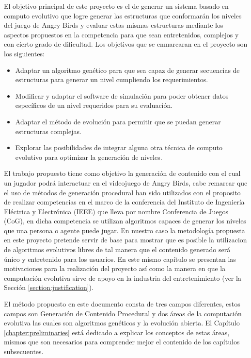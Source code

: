 El objetivo principal de este proyecto es el de generar un sistema basado en
computo evolutivo que logre generar las estructuras que conformarán los niveles
del juego de Angry Birds y evaluar estas mismas estructuras mediante los
aspectos propuestos en la competencia para que sean entretenidos, complejos y con 
cierto grado de dificultad.  Los objetivos que se enmarcaran en el proyecto son los siguientes: 

\begin{itemize}
  \item Adaptar un algoritmo genético para que sea capaz de generar secuencias
  de estructuras para generar un nivel cumpliendo los requerimientos.
  \item Modificar y adaptar el software de simulación para poder obtener datos
  específicos de un nivel requeridos para su evaluación.
  \item Adaptar el método de evolución para permitir que se puedan generar
  estructuras complejas.
  \item Explorar las posibilidades de integrar alguna otra técnica de computo
  evolutivo para optimizar la generación de niveles.
\end{itemize} 

El trabajo propuesto tiene como objetivo la generación
de contenido con el cual un jugador podrá interactuar en el videojuego de
Angry Birds, cabe remarcar que el uso de métodos de generación procedural han
sido utilizados con el proposito de realizar competencias en el marco de la
conferencia del Instituto de Ingeniería Eléctrica y Electrónica (IEEE) que lleva
por nombre Conferencia de Juegos (CoG), en dicha competencia se utilizan
algoritmos capaces de generar los niveles que una persona o agente puede jugar.
En nuestro caso la metodología propuesta en este proyecto pretende servir de
base para mostrar que es posible la utilizacion de algoritmos evolutivos libres
de tal manera que el contenido generado será único y entretenido para los
usuarios. En este mismo capítulo se presentan las motivaciones para la
realización del proyecto así como la manera en que la computación evolutiva
sirve de apoyo en la industria del entretenimiento (ver la Sección
\ref{section:justification}).

El método propuesto en este documento consta de tres campos diferentes, estos
campos son Generación de Contenido Procedural y dos áreas de la computación
evolutiva las cuales son algoritmos genéticos y la evolución abierta. El
Capítulo \ref{chapter:preliminaries} está dedicado a explicar los conceptos
de estas áreas, mismos que son necesarios para comprender mejor el contenido de
los capítulos subsecuentes.


